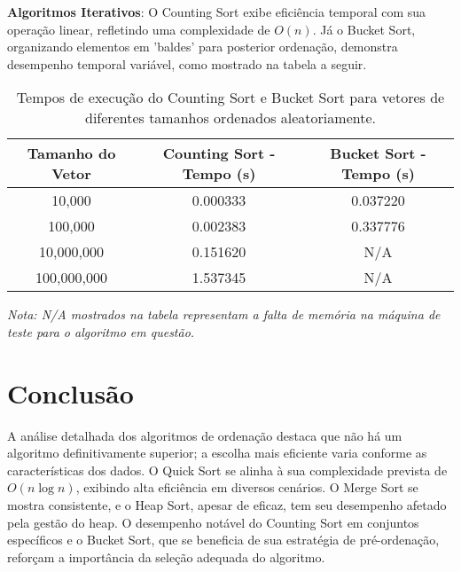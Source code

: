 \documentclass[conference]{IEEEtran}
\begin{document}
\vspace{0.4cm}
\textbf{Algoritmos Iterativos}: O Counting Sort exibe eficiência temporal com sua operação linear, refletindo uma complexidade de \( O(n) \). Já o Bucket Sort, organizando elementos em 'baldes' para posterior ordenação, demonstra desempenho temporal variável, como mostrado na tabela a seguir.


\vspace{0.5cm}
\begin{table}[ht]
\centering
\caption{Tempos de execução do Counting Sort e Bucket Sort para vetores de diferentes tamanhos ordenados aleatoriamente.}
\label{tab:sorting_algorithms_execution_times}
\begin{tabular}{@{}ccc@{}}
\toprule
Tamanho do Vetor & Counting Sort - Tempo (s) & Bucket Sort - Tempo (s) \\ \midrule
10,000           & 0.000333                      & 0.037220                     \\
100,000          & 0.002383                      & 0.337776                     \\
10,000,000       & 0.151620                      & N/A                            \\
 100,000,000      & 1.537345                      & N/A    
      \\%
\bottomrule
\end{tabular}
\end{table}
{\small \textit{Nota: N/A mostrados na tabela representam a falta de memória na máquina de teste para o algoritmo em questão.}}

\vspace{0.5cm}

\section{Conclusão}
A análise detalhada dos algoritmos de ordenação destaca que não há um algoritmo definitivamente superior; a escolha mais eficiente varia conforme as características dos dados. O Quick Sort se alinha à sua complexidade prevista de \( O(n \log n) \), exibindo alta eficiência em diversos cenários. O Merge Sort se mostra consistente, e o Heap Sort, apesar de eficaz, tem seu desempenho afetado pela gestão do heap. O desempenho notável do Counting Sort em conjuntos específicos e o Bucket Sort, que se beneficia de sua estratégia de pré-ordenação, reforçam a importância da seleção adequada do algoritmo.
\end{document}
